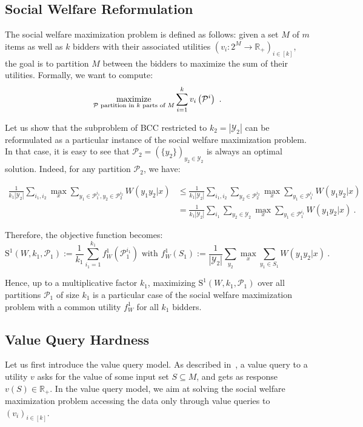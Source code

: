 \subsection{Social Welfare Reformulation}
The social welfare maximization problem is defined as follows: given a set $M$ of $m$ items as well as $k$ bidders with their associated utilities $\left(v_i : 2^M \rightarrow \mathbb{R}_+\right)_{i \in [k]}$, the goal is to partition $M$ between the bidders to maximize the sum of their utilities. Formally, we want to compute:
 \[ \underset{\mathcal{P} \text{ partition in $k$ parts of } M}{\operatorname{\text{maximize}}}\sum_{i=1}^k v_i\left(\mathcal{P}^i\right) \ . \]

 Let us show that the subproblem of \textsc{BCC} restricted to $k_2=|\mathcal{Y}_2|$ can be reformulated as a particular instance of the social welfare maximization problem. In that case, it is easy to see that $\mathcal{P}_2 = (\{y_2\})_{y_2 \in \mathcal{Y}_2}$ is always an optimal solution. Indeed, for any partition $\mathcal{P}_2$, we have:

\begin{equation}
  \begin{aligned}
    \frac{1}{k_1|\mathcal{Y}_2|}\sum_{i_1,i_2}  \max_x \sum_{y_1 \in \mathcal{P}_1^{i_1}, y_2 \in \mathcal{P}_2^{i_2}} W(y_1y_2|x) &\leq \frac{1}{k_1|\mathcal{Y}_2|}\sum_{i_1,i_2}  \sum_{y_2 \in \mathcal{P}_2^{i_2}} \max_x \sum_{y_1 \in \mathcal{P}_1^{i_1}} W(y_1y_2|x) \\
    &= \frac{1}{k_1|\mathcal{Y}_2|}\sum_{i_1}  \sum_{y_2 \in \mathcal{Y}_2} \max_x \sum_{y_1 \in \mathcal{P}_1^{i_1}} W(y_1y_2|x) \ .
  \end{aligned}
\end{equation}

Therefore, the objective function becomes:
\[ \mathrm{S}^1(W,k_1,\mathcal{P}_1) := \frac{1}{k_1}\sum_{i_1=1}^{k_1} f_W^1(\mathcal{P}_1^{i_1}) \text{ with } f_W^1(S_1) := \frac{1}{|\mathcal{Y}_2|}\sum_{y_2} \max_x \sum_{y_1 \in S_1} W(y_1y_2|x)\ .\]


Hence, up to a multiplicative factor $k_1$, maximizing $\mathrm{S}^1(W,k_1,\mathcal{P}_1)$ over all partitions $\mathcal{P}_1$ of size $k_1$ is a particular case of the social welfare maximization problem with a common utility $f_W^1$ for all $k_1$ bidders.

\subsection{Value Query Hardness}
Let us first introduce the value query model. As described in~\cite{DS06,MSV08}, a value query to a utility $v$ asks for the value of some input set $S \subseteq M$, and gets as response $v(S) \in \mathbb{R}_+$. In the value query model, we aim at solving the social welfare maximization problem accessing the data only through value queries to $(v_i)_{i \in [k]}$.

